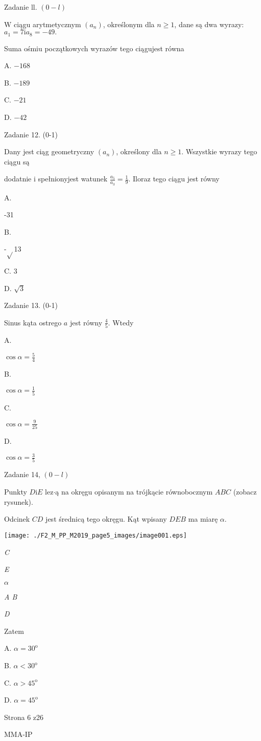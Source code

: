 \documentclass[a4paper,12pt]{article}
\begin{document}
Zadanie ll. $(0-l)$

$\mathrm{W}$ ciągu arytmetycznym $(a_{n})$, określonym dla $n\geq 1$, dane są dwa wyrazy: $a_{1}=7\mathrm{i}a_{8}=-49.$

Suma ośmiu początkowych wyrazów tego ciągujest równa

A. $-168$

B. $-189$

C. $-21$

D. $-42$

Zadanie 12. (0-1)

Dany jest ciąg geometryczny $(a_{n})$, określony dla $n\geq 1$. Wszystkie wyrazy tego ciągu są

dodatnie i spełnionyjest watunek $\displaystyle \frac{a_{5}}{a_{3}}=\frac{1}{9}$. Iloraz tego ciągu jest równy

A.

-31

B.

-$\sqrt{}$13

C. 3

D. $\sqrt{3}$

Zadanie 13. (0-1)

Sinus kąta ostrego $a$ jest równy $\displaystyle \frac{4}{5}$. Wtedy

A.

$\displaystyle \cos\alpha=\frac{5}{4}$

B.

$\displaystyle \cos\alpha=\frac{1}{5}$

C.

$\displaystyle \cos\alpha=\frac{9}{25}$

D.

$\displaystyle \cos\alpha=\frac{3}{5}$

Zadanie 14, $(0-l)$

Punkty $D\mathrm{i}E$ lez$\cdot$ą na okręgu opisanym na trójkącie równobocznym $ABC$ (zobacz rysunek).

Odcinek $CD$ jest średnicą tego okręgu. Kąt wpisany $DEB$ ma miarę $\alpha.$
\begin{center}
\texttt{[image: ./F2\_M\_PP\_M2019\_page5\_images/image001.eps]}
\end{center}
{\it C}

{\it E}

$\alpha$

{\it A  B}

{\it D}

Zatem

A. $\alpha=30^{\mathrm{o}}$

B. $\alpha<30^{\mathrm{o}}$

C. $\alpha>45^{\mathrm{o}}$

D. $\alpha=45^{\mathrm{o}}$

Strona 6 z26

MMA-IP
\end{document}
